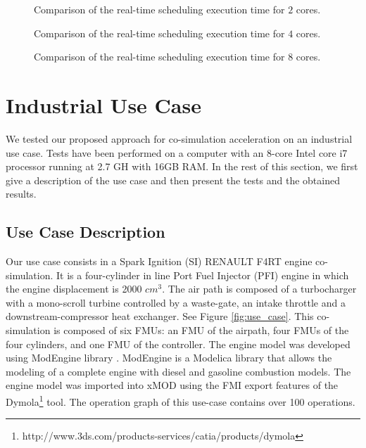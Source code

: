 \begin{figure}[phbt]
\centering

\caption{Comparison of the real-time scheduling execution time for $2$ cores.}
\label{fig:RT_sched_exec_2}
\end{figure}

\begin{figure}[phbt]
\centering

\caption{Comparison of the real-time scheduling execution time for $4$ cores.}
\label{fig:RT_sched_exec_4}
\end{figure}

\begin{figure}[phbt]
\centering

\caption{Comparison of the real-time scheduling execution time for $8$ cores.}
\label{fig:RT_sched_exec_8}
\end{figure}


\section{Industrial Use Case} 

We tested our proposed approach for co-simulation acceleration on an industrial use case. Tests have been performed on a computer with an 8-core Intel core i7 processor running at 2.7 GH with 16GB RAM. In the rest of this section, we first give a description of the use case and then present the tests and the obtained results.

\subsection{Use Case Description}

Our use case consists in a Spark Ignition (SI) RENAULT F4RT engine co-simulation. It is a four-cylinder in line Port Fuel Injector (PFI) engine in which the engine displacement is 2000 $cm^3$. The air path is composed of a turbocharger with a mono-scroll turbine controlled by a waste-gate, an intake throttle and a downstream-compressor heat exchanger. See Figure \ref{fig:use_case}. This co-simulation is composed of six FMUs: an FMU of the airpath, four FMUs of the four cylinders, and one FMU of the controller.
The engine model was developed using ModEngine library \cite{benjelloun:2011}. ModEngine is a Modelica library that allows the modeling of a complete engine with diesel and gasoline combustion models. The engine model was imported into xMOD using the FMI export features of the Dymola\footnote{http://www.3ds.com/products-services/catia/products/dymola} tool. The operation graph of this use-case contains over 100 operations.

